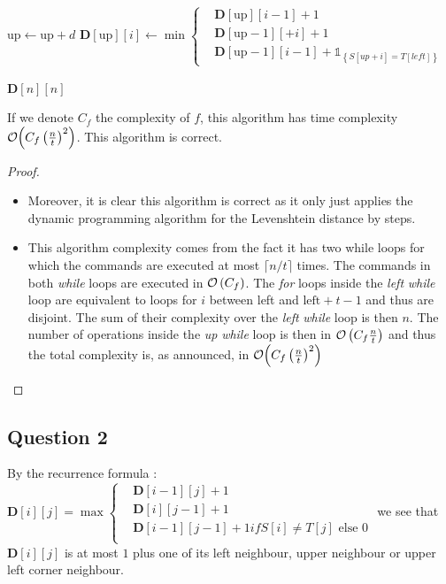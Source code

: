 \documentclass{cours}
\begin{document}
\begin{algorithm}
\begin{algorithmic}
                \EndFor
            \EndWhile
            \State $\text{up} \gets \text{up} + d$
                    \State $\mathbf{D}[\text{up}][i] \gets \min{\begin{cases}&\mathbf{D}[\text{up}][i - 1] + 1 \\ &\mathbf{D}[\text{up} - 1][ + i] + 1\\ &\mathbf{D}[\text{up} - 1][i - 1] + \mathds{1}_{\left\{S[up + i] = T[left]\right\}} \end{cases}}$ \\ 
                \EndFor
        \EndWhile\\

        \Return $\mathbf{D}[n][n]$
    
    \end{algorithmic}
\end{algorithm}
\begin{proposition}
    If we denote $C_{f}$ the complexity of $f$, this algorithm has time complexity $\mathcal{O}{\left(C_{f}\left(\frac{n}{t}\right)^{2}\right)}$. This algorithm is correct.
\end{proposition}
\begin{proof}
    \begin{itemize}
        \item Moreover, it is clear this algorithm is correct as it only just applies the dynamic programming algorithm for the Levenshtein distance by steps.
        \item This algorithm complexity comes from the fact it has two while loops for which the commands are executed at most $\lceil n/t \rceil$ times. The commands in both \emph{while} loops are executed in $\mathcal{O}\left(C_{f}\right)$. The \emph{for} loops inside the \textit{left} \emph{while} loop are equivalent to loops for $i$ between left and $\text{left} + t - 1$ and thus are disjoint. The sum of their complexity over the \textit{left} \emph{while} loop is then $n$. The number of operations inside the \textit{up} \emph{while} loop is then in $\mathcal{O}\left(C_{f}\frac{n}{t}\right)$ and thus the total complexity is, as announced, in $\mathcal{O}{\left(C_{f}\left(\frac{n}{t}\right)^{2}\right)}$
    \end{itemize}
\end{proof}


\subsection{Question 2}
By the recurrence formula : $\mathbf{D}[i][j] = \max 
\begin{cases}
    &\mathbf{D}[i-1][j] + 1\\
    &\mathbf{D}[i][j-1] + 1\\
    &\mathbf{D}[i-1][j-1] + 1 if S[i] \neq T[j] \text{ else } 0\\
\end{cases}$
we see that $\mathbf{D}[i][j]$ is at most $1$ plus one of its left neighbour, upper neighbour or upper left corner neighbour.
\end{document}
